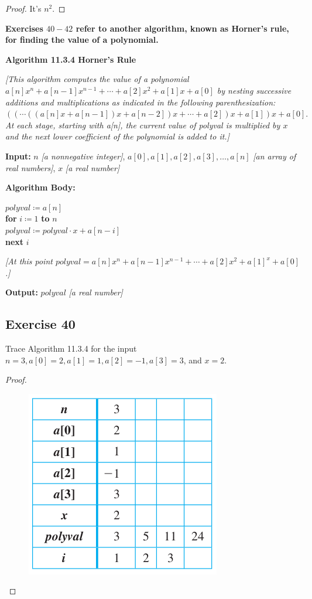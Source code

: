\documentclass[14pt]{extarticle}
\newcommand{\cy}{\color{cyan}}
\begin{document}
\begin{proof}
It's \(n^2\).
\end{proof}

{\bf \cy Exercises \(40-42\) refer to another algorithm, known as Horner’s rule, for finding the value of a polynomial.}

\begin{tcolorbox}[colframe=cyan]
{\bf \cy Algorithm 11.3.4 Horner's Rule}

{\it [This algorithm computes the value of a polynomial \(a[n]x^n + a[n-1]x^{n-1} + \cdots + a[2]x^2 + a[1]x + a[0]\) 
by nesting successive additions and multiplications as indicated in the following parenthesization: \(((\cdots((a[n]x 
+ a[n-1])x + a[n-2])x + \cdots + a[2])x + a[1])x + a[0].\) At each stage, starting with a[n], the current value of polyval 
is multiplied by \(x\) and the next lower coefficient of the polynomial is added to it.]}

{\bf Input:} \(n\) {\it [a nonnegative integer]}, \(a[0], a[1], a[2], a[3], \ldots, a[n]\) {\it [an array of real 
numbers]}, \(x\) {\it [a real number]}

{\bf Algorithm Body:} 
\begin{tabbing}
\(polyval \coloneqq a[n]\) \\
{\bf for} \= \(i \coloneqq 1\) {\bf to} \(n\) \\
          \> \(polyval \coloneqq polyval \cdot x + a[n-i]\) \\
{\bf next} \(i\)
\end{tabbing}

{\it [At this point \(polyval = a[n]x^n + a[n-1]x^{n-1} + \cdots + a[2]x^2 + a[1]^x + a[0]\).]}

{\bf Output:} \(polyval\) {\it [a real number]}
\end{tcolorbox}

\subsection{Exercise 40}
Trace Algorithm 11.3.4 for the input \(n = 3, a[0] = 2, a[1] = 1, a[2] = -1, a[3] = 3\), and \(x = 2\).

\begin{proof}
\begin{figure}[ht!]
\centering
\includegraphics[scale=0.6]{../images/11.3.40.png}
\end{figure}
\end{proof}
\end{document}
